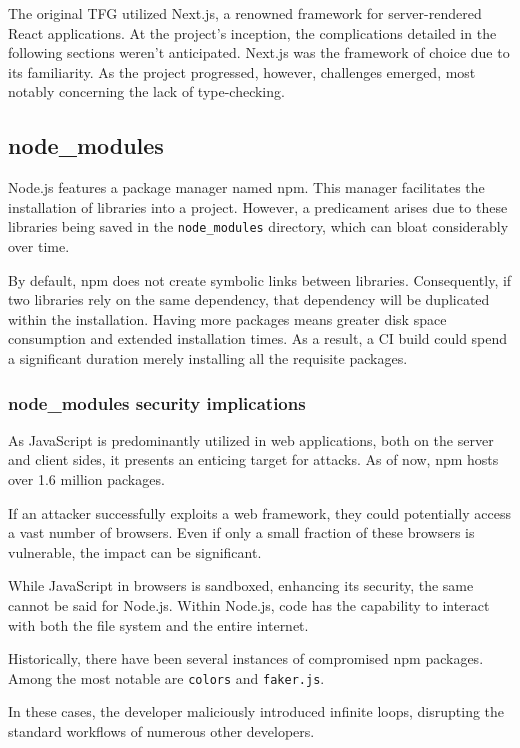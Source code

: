 \documentclass[10pt,journal,compsoc]{IEEEtran}
\begin{document}
The original TFG \cite{TFG} utilized Next.js, a renowned framework for server-rendered React applications. At the project's inception, the complications detailed in the following sections weren't anticipated. Next.js was the framework of choice due to its familiarity. As the project progressed, however, challenges emerged, most notably concerning the lack of type-checking.

\subsection{node\_modules}

Node.js features a package manager named npm. This manager facilitates the installation of libraries into a project. However, a predicament arises due to these libraries being saved in the \verb|node_modules| directory, which can bloat considerably over time. \cite{BADNPM}

By default, npm does not create symbolic links between libraries. Consequently, if two libraries rely on the same dependency, that dependency will be duplicated within the installation. Having more packages means greater disk space consumption and extended installation times. As a result, a CI build could spend a significant duration merely installing all the requisite packages.


\subsubsection{node\_modules security implications}

As JavaScript is predominantly utilized in web applications, both on the server and client sides, it presents an enticing target for attacks. As of now, npm hosts over 1.6 million packages. \cite{NPMCOUNT}

If an attacker successfully exploits a web framework, they could potentially access a vast number of browsers. Even if only a small fraction of these browsers is vulnerable, the impact can be significant.

While JavaScript in browsers is sandboxed, enhancing its security, the same cannot be said for Node.js. Within Node.js, code has the capability to interact with both the file system and the entire internet.

Historically, there have been several instances of compromised npm packages. Among the most notable are \verb|colors| and \verb|faker.js|. \cite{BADFAKER} \cite{VERGEFAKER}

In these cases, the developer maliciously introduced infinite loops, disrupting the standard workflows of numerous other developers.
\end{document}
